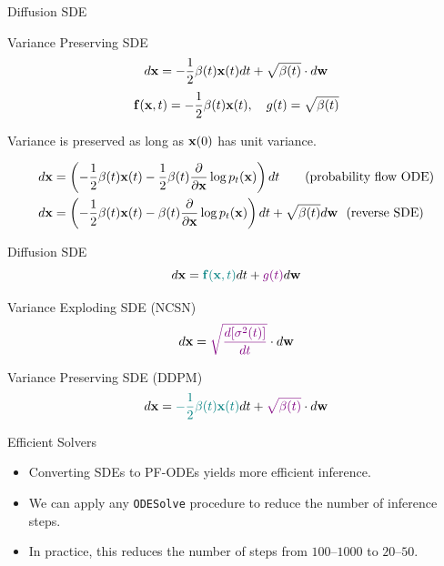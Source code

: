 \documentclass{beamer}
\renewcommand{\eqpause}{}
\begin{document}
\begin{frame}{Diffusion SDE}
	\begin{block}{Variance Preserving SDE}
		\vspace{-0.3cm}
		\[
			d \mathbf{x} = - \frac{1}{2} \beta(t) \mathbf{x}(t) dt + \sqrt{\beta(t)} \cdot d \mathbf{w}
		\]
		\[
			\mathbf{f}(\mathbf{x}, t) = - \frac{1}{2} \beta(t) \mathbf{x}(t) , \quad g(t) = \sqrt{\beta(t)} 
		\]
	\end{block}
	Variance is preserved as long as $\mathbf{x}(0)$ has unit variance.
    \eqpause
	\begin{align*}
		d\mathbf{x} &= \left(- \frac{1}{2} \beta(t) \mathbf{x}(t) - \frac{1}{2} \beta(t) \frac{\partial}{\partial \mathbf{x}} \log p_t(\mathbf{x}) \right) dt \quad\quad \text{(probability flow ODE)} \\
		d\mathbf{x} &= \left(- \frac{1}{2} \beta(t) \mathbf{x}(t) - \beta(t) \frac{\partial}{\partial \mathbf{x}} \log p_t(\mathbf{x})\right) dt + \sqrt{\beta(t)} d \mathbf{w}\ \ \text{(reverse SDE)}
	\end{align*}
\end{frame}
\begin{frame}{Diffusion SDE}
	\vspace{-0.3cm}
	\[
		d\mathbf{x} = {\color{teal}\mathbf{f}(\mathbf{x}, t)} dt + {\color{violet}g(t)} d \mathbf{w}
	\]
    \eqpause
	\vspace{-0.5cm}
	\begin{block}{Variance Exploding SDE (NCSN)}
		\vspace{-0.3cm}
		\[
			d \mathbf{x} = {\color{violet}\sqrt{\frac{ d [\sigma^2(t)]}{dt}}} \cdot d \mathbf{w}
		\]
		\vspace{-0.5cm}
	\end{block}
	\begin{block}{Variance Preserving SDE (DDPM)}
		\vspace{-0.3cm}
		\[
			d \mathbf{x} = {\color{teal}- \frac{1}{2} \beta(t) \mathbf{x}(t)} dt + {\color{violet}\sqrt{\beta(t)}} \cdot d \mathbf{w}
		\]
		\vspace{-0.7cm}
	\end{block}
    \eqpause
	\begin{block}{Efficient Solvers}
		\begin{itemize}
		\item Converting SDEs to PF-ODEs yields more efficient inference.
		\item We can apply any \texttt{ODESolve} procedure to reduce the number of inference steps.
		\item In practice, this reduces the number of steps from $100$--$1000$ to $20$--$50$.
		\end{itemize}
	\end{block}
\end{frame}
\end{document}
